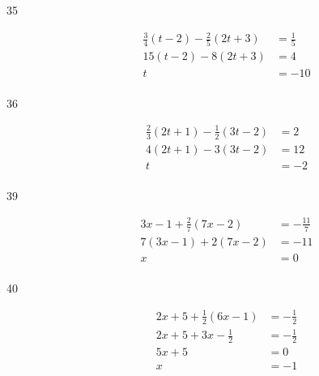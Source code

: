 \documentclass[letterpaper]{exam}
\begin{document}
\begin{description}
      \item[35]
        \begin{align*}
          \frac{3}{4}(t - 2) - \frac{2}{5}(2t + 3) & = \frac{1}{5} \\
          15(t - 2) - 8(2t + 3)                    & = 4 \\
          t                                        & = \boxed{ -10 } \\
        \end{align*}

      \item[36] 
        \begin{align*}
          \frac{2}{3} (2t + 1) - \frac{1}{2} (3t - 2) & = 2 \\
          4(2t + 1) - 3(3t - 2)                       & = 12 \\
          t                                           & = \boxed{ -2 } \\
        \end{align*}


      \item[39]
        \begin{align*}
          3x - 1 + \frac{2}{7}(7x - 2) & = - \frac{11}{7} \\
          7(3x - 1) + 2(7x - 2)        & = -11 \\
          x                            & = \boxed{ 0 } \\
        \end{align*}

      \item[40]
        \begin{align*}
          2x + 5 + \frac{1}{2}(6x - 1) & = -\frac{1}{2} \\
          2x + 5 + 3x - \frac{1}{2}    & = -\frac{1}{2} \\
          5x + 5                       & = 0 \\
          x                            & = \boxed{ -1 } \\
        \end{align*}


\end{description}
\end{document}
